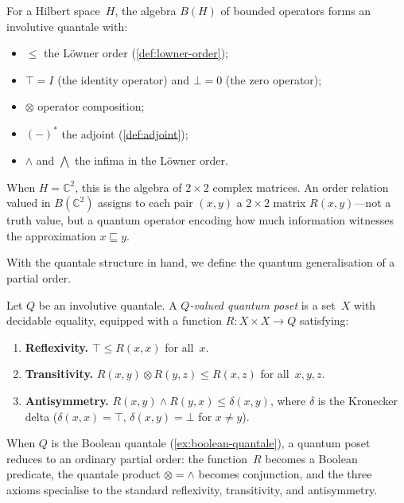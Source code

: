 \begin{example}
\label{ex:bh-quantale}
For a Hilbert space~$H$, the algebra $B(H)$ of bounded operators
forms an involutive quantale with:
\begin{itemize}
  \item $\leq$ the L\"owner order (\cref{def:lowner-order});
  \item $\top = I$ (the identity operator) and $\bot = 0$ (the zero
    operator);
  \item $\otimes$ operator composition;
  \item $(-)^*$ the adjoint (\cref{def:adjoint});
  \item $\wedge$ and $\bigwedge$ the infima in the L\"owner order.
\end{itemize}
When $H = \mathbb{C}^2$, this is the algebra of
$2 \times 2$ complex matrices.
An order relation valued in $B(\mathbb{C}^2)$ assigns to each pair
$(x, y)$ a $2 \times 2$ matrix $R(x, y)$---not a truth value, but a
quantum operator encoding how much information witnesses the
approximation $x \sqsubseteq y$.
\end{example}

\noindent
With the quantale structure in hand, we define the quantum
generalisation of a partial order.

\begin{definition}
\label{def:qposet}
Let $Q$ be an involutive quantale.
A \emph{$Q$-valued quantum poset} is a set~$X$ with decidable
equality, equipped with a function $R : X \times X \to Q$ satisfying:
\begin{enumerate}
  \item \textbf{Reflexivity.} $\top \leq R(x, x)$ for all~$x$.
  \item \textbf{Transitivity.}
    $R(x, y) \otimes R(y, z) \leq R(x, z)$ for all~$x, y, z$.
  \item \textbf{Antisymmetry.}
    $R(x, y) \wedge R(y, x) \leq \delta(x, y)$, where
    $\delta$ is the Kronecker delta
    ($\delta(x,x) = \top$, $\delta(x,y) = \bot$ for $x \neq y$).
\end{enumerate}
\end{definition}

\noindent
When $Q$ is the Boolean quantale (\cref{ex:boolean-quantale}), a
quantum poset reduces to an ordinary partial order: the function~$R$
becomes a Boolean predicate, the quantale product
$\otimes = \wedge$ becomes conjunction, and the three axioms
specialise to the standard reflexivity, transitivity, and
antisymmetry.

